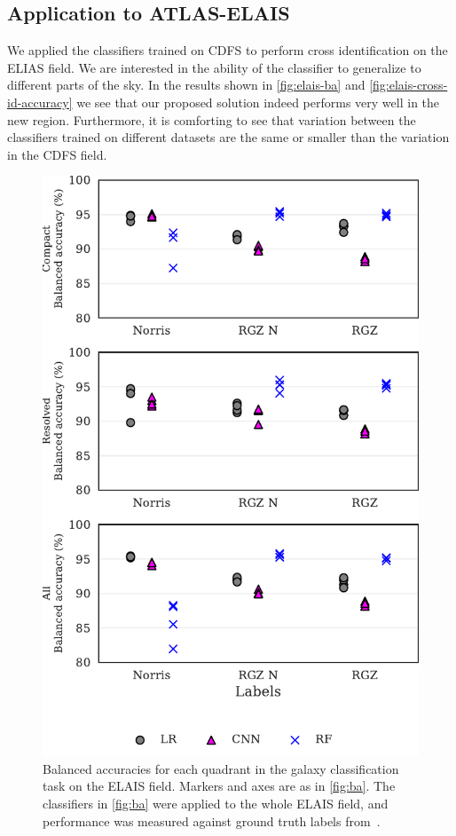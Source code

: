 \documentclass[fleqn,usenatbib,usedcolumn]{mnras}
\begin{document}
\subsection{Application to ATLAS-ELAIS}
\label{sec:elais}

We applied the classifiers trained on CDFS to perform cross identification on the ELIAS field.
We are interested
in the ability of the classifier to generalize to different parts of the sky. In the results
shown in \autoref{fig:elais-ba} and \autoref{fig:elais-cross-id-accuracy} we see that our
proposed solution indeed performs very well in the new region. Furthermore, it is comforting
to see that variation between the classifiers trained on different datasets are the same or
smaller than the variation in the CDFS field.

\begin{figure}[ht]
\centering
\includegraphics[width=\columnwidth]{images/elais_ba_grid.pdf}
\caption{Balanced accuracies for each quadrant in the galaxy
  classification task on the ELAIS field. Markers and axes are as in \autoref{fig:ba}.
  The classifiers in \autoref{fig:ba}
  were applied to the whole ELAIS field, and performance was measured against
  ground truth labels from~\citet{middelberg08}.
  \label{fig:elais-ba}}
\end{figure}
\end{document}

